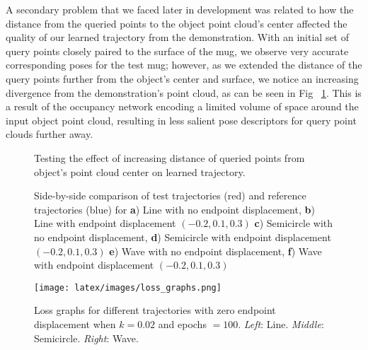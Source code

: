 \documentclass[10pt,twocolumn,letterpaper]{article}
\begin{document}
A secondary problem that we faced later in development was related to how the distance from the queried points to the object point cloud's center affected the quality of our learned trajectory from the demonstration. With an initial set of query points closely paired to the surface of the mug, we observe very accurate corresponding poses for the test mug; however, as we extended the distance of the query points further from the object's center and surface, we notice an increasing divergence from the demonstration's point cloud, as can be seen in Fig ~\ref{fig:limit_comb}. This is a result of the occupancy network encoding a limited volume of space around the input object point cloud, resulting in less salient pose descriptors for query point clouds further away. 

\begin{figure}[t]
\centering
\setlength\fboxsep{0pt}
\setlength\fboxrule{0.4pt}
\caption{Testing the effect of increasing distance of queried points from object's point cloud center on learned trajectory.}
\label{fig:limit_comb}
\end{figure}


\begin{figure*}[h]
    \centering
    \caption{Side-by-side comparison of test trajectories (red) and reference trajectories (blue) for \textbf{a}) Line with no endpoint displacement, \textbf{b}) Line with endpoint displacement $(-0.2, 0.1, 0.3)$ \textbf{c}) Semicircle with no endpoint displacement, \textbf{d}) Semicircle with endpoint displacement $(-0.2, 0.1, 0.3)$ \textbf{e}) Wave with no endpoint displacement, \textbf{f}) Wave with endpoint displacement $(-0.2, 0.1, 0.3)$}
    \label{fig:result}
\end{figure*}

\begin{figure*}[h]
    \centering
    \texttt{[image: latex/images/loss\_graphs.png]}
    \caption{Loss graphs for different trajectories with zero endpoint displacement when $k = 0.02$ and epochs $= 100$. \textit{Left}: Line.  \textit{Middle}: Semicircle. \textit{Right}: Wave.}
    \label{fig:loss_graphs}
\end{figure*}
\end{document}

